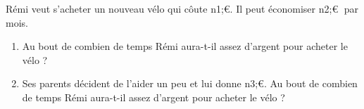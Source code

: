 \documentclass[exercice]{thedocument}%
\begin{document}
%
Rémi veut s'acheter un nouveau vélo qui côute \<n1;\euro. Il peut économiser \<n2;\euro$\;$ par
mois.
\begin{enumerate}
    \item Au bout de combien de temps Rémi aura-t-il assez d'argent pour acheter le vélo ?
    \item Ses parents décident de l'aider un peu et lui donne \<n3;\euro. Au bout de combien de
    temps Rémi aura-t-il assez d'argent pour acheter le vélo ?
\end{enumerate}
\end{document}

